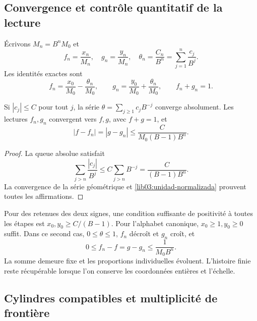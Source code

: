 \subsection{Convergence et contrôle quantitatif de la lecture}
\label{lib03:limite}

Écrivons \(M_n=B^nM_0\) et
\begin{equation}
 f_n=\frac{x_n}{M_n},\quad g_n=\frac{y_n}{M_n},\quad
 \theta_n=\frac{C_n}{B^n}=\sum_{j=1}^n\frac{c_j}{B^j}.
 \label{lib03:lecturas-normalizadas}
\end{equation}
Les identités exactes sont
\begin{equation}
 f_n=\frac{x_0}{M_0}-\frac{\theta_n}{M_0},\qquad
 g_n=\frac{y_0}{M_0}+\frac{\theta_n}{M_0},\qquad f_n+g_n=1.
 \label{lib03:unidad-normalizada}
\end{equation}

\begin{theorem}
\label{lib03:teo-limite}
Si \(|c_j|\leq C\) pour tout \(j\), la série \(\theta=\sum_{j\geq1}c_jB^{-j}\) converge absolument. Les lectures \(f_n,g_n\) convergent vers \(f,g\), avec \(f+g=1\), et
\begin{equation}
 |f-f_n|=|g-g_n|\leq\frac{C}{M_0(B-1)B^n}.
 \label{lib03:cota-cola}
\end{equation}
\end{theorem}

\begin{proof}
La queue absolue satisfait
\[
 \sum_{j>n}\frac{|c_j|}{B^j}
 \leq C\sum_{j>n}B^{-j}=\frac{C}{(B-1)B^n}.
\]
La convergence de la série géométrique et
\eqref{lib03:unidad-normalizada} prouvent toutes les affirmations.
\end{proof}

Pour des retenues des deux signes, une condition suffisante de positivité
à toutes les étapes est \(x_0,y_0\geq C/(B-1)\). Pour l’alphabet
canonique, \(x_0\geq1,y_0\geq0\) suffit. Dans ce second cas,
\(0\leq\theta\leq1\), \(f_n\) décroît et \(g_n\) croît, et
\begin{equation}
 0\leq f_n-f=g-g_n\leq\frac1{M_0B^n}.
 \label{lib03:cota-canonica}
\end{equation}
La somme demeure fixe et les proportions individuelles évoluent.
L’histoire finie reste récupérable lorsque l’on conserve les
coordonnées entières et l’échelle.

\subsection{Cylindres compatibles et multiplicité de frontière}
\label{lib03:cilindros}

